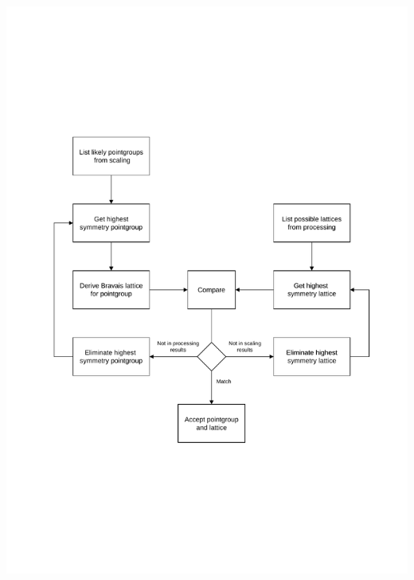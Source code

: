 \documentclass[a4paper, 11pt]{article}
\begin{document}
\includegraphics[scale=0.5]{figures/scaling-step-1.pdf}
\end{document}
